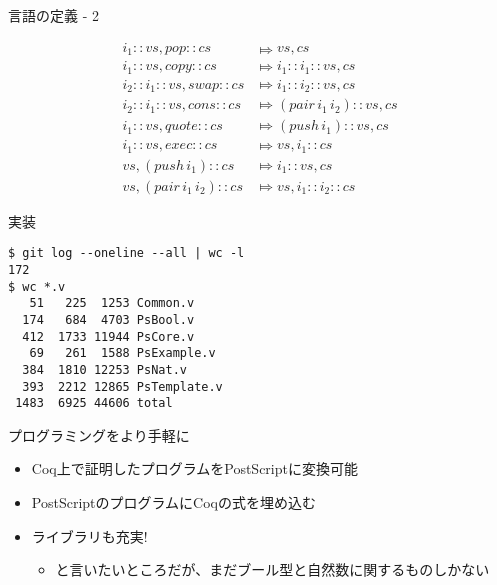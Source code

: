 \documentclass[cjk, 14pt, dvipdfm]{beamer}
\begin{document}
\begin{frame}{言語の定義 - 2}

 \begin{align*}
  i_1 :: vs , \mathit{pop} :: cs           & \Mapsto vs , cs \\
  i_1 :: vs , \mathit{copy} :: cs          & \Mapsto i_1 :: i_1 :: vs , cs \\
  i_2 :: i_1 :: vs , \mathit{swap} :: cs   & \Mapsto i_1 :: i_2 :: vs, cs \\
  i_2 :: i_1 :: vs , \mathit{cons} :: cs   & \Mapsto (\mathit{pair} \, i_1 \, i_2) :: vs , cs \\
  i_1 :: vs , \mathit{quote} :: cs         & \Mapsto (\mathit{push} \, i_1) :: vs , cs \\
  i_1 :: vs , \mathit{exec} :: cs          & \Mapsto vs , i_1 :: cs \\
  vs , (\mathit{push} \, i_1) :: cs        & \Mapsto i_1 :: vs , cs \\
  vs , (\mathit{pair} \, i_1 \, i_2) :: cs & \Mapsto vs , i_1 :: i_2 :: cs
 \end{align*}

\end{frame}

\begin{frame}[fragile]{実装}

\begin{lstlisting}[style=plain, basicstyle=\tt]
$ git log --oneline --all | wc -l
172
$ wc *.v
   51   225  1253 Common.v
  174   684  4703 PsBool.v
  412  1733 11944 PsCore.v
   69   261  1588 PsExample.v
  384  1810 12253 PsNat.v
  393  2212 12865 PsTemplate.v
 1483  6925 44606 total
\end{lstlisting}

\end{frame}

\begin{frame}{プログラミングをより手軽に}

 \begin{itemize}
  \item Coq上で証明したプログラムをPostScriptに変換可能
  \item PostScriptのプログラムにCoqの式を埋め込む
  \item ライブラリも充実!
	\begin{itemize}
	 \item と言いたいところだが、まだブール型と自然数に関するものしかない
	\end{itemize}
 \end{itemize}

\end{frame}
\end{document}
